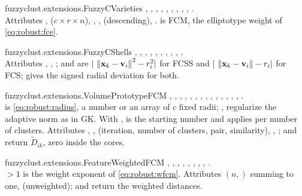 \begin{apibox}{fuzzyclust.extensions.FuzzyCVarieties}
, , , , , , , , , .\\
Attributes ,  ($c\times r\times n$), , ,  (descending), .  is FCM,  the elliptotype weight of \eqref{eq:robust:fce}.
\end{apibox}

\begin{apibox}{fuzzyclust.extensions.FuzzyCShells}
, , , , , , , , , .\\
Attributes , , ;  and  are $|\,\left\lVert \mathbf{x}_k-\mathbf{v}_i \right\rVert^2-r_i^2|$ for FCSS and $|\,\left\lVert \mathbf{x}_k-\mathbf{v}_i \right\rVert-r_i|$ for FCS;  gives the signed radial deviation for both.
\end{apibox}

\begin{apibox}{fuzzyclust.extensions.VolumePrototypeFCM}
, , , , , , , , , , , , , , .\\
 is  \eqref{eq:robust:radius}, a number or an array of $c$ fixed radii; ,  regularize the adaptive norm as in GK. With ,  is the starting number and  applies per number of clusters. Attributes , ,  (iteration, number of clusters, pair, similarity), , ;  and  return $\tilde D_{ik}$, zero inside the cores.
\end{apibox}

\begin{apibox}{fuzzyclust.extensions.FeatureWeightedFCM}
, , , , , , , , .\\
$>1$ is the weight exponent of \eqref{eq:robust:wfcm}. Attributes  $(n,)$ summing to one,  (unweighted);  and  return the weighted distances.
\end{apibox}

